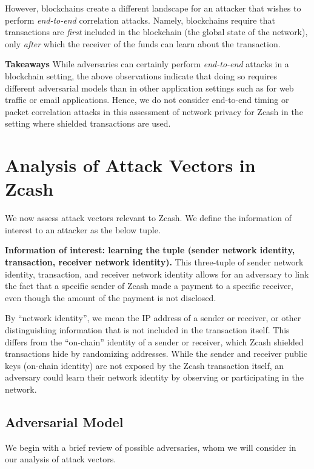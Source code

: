 \documentclass{article}
\begin{document}
However, blockchains create a different landscape for an attacker that
wishes to perform \emph{end-to-end} correlation attacks. Namely, blockchains require
that transactions are \emph{first} included in the blockchain (the global state
of the network), only \emph{after} which the receiver of the funds can learn
about the transaction.


\textbf{Takeaways}
While adversaries can certainly perform \emph{end-to-end} attacks in a blockchain
setting, the above observations indicate that doing so requires different
adversarial models than in other application settings such as for web traffic or email
applications. Hence, we do not consider end-to-end timing or packet correlation
attacks in this assessment of network privacy for Zcash in the setting where
shielded transactions are used.


\section{Analysis of Attack Vectors in Zcash}
\label{threat-model}

We now assess attack vectors relevant to Zcash. We define the information of
interest to an attacker as the below tuple.

\textbf{Information of interest: learning the tuple (sender network identity, transaction, receiver network identity).}
This three-tuple of sender network identity, transaction, and receiver network
identity allows for an adversary to link the fact that a
specific sender of Zcash made a payment to a specific receiver, even though the
amount of the payment is not disclosed.

By ``network identity'', we mean the IP address of a sender or receiver, or other
distinguishing information that is not included in the transaction itself. This
differs from the ``on-chain'' identity of a sender or receiver, which Zcash
shielded transactions hide by randomizing addresses.
While the sender and receiver public keys (on-chain identity)
are not exposed by the Zcash transaction itself, an adversary
could learn their network identity by observing or participating in the
network.

\subsection{Adversarial Model}

We begin with a brief review of possible adversaries, whom we will consider in
our analysis of attack vectors.
\end{document}
